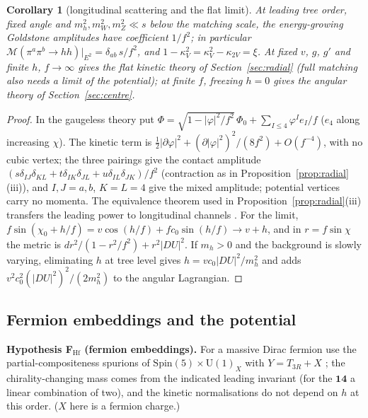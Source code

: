\documentclass[aps,pra,onecolumn,superscriptaddress,nofootinbib,10pt]{revtex4-2}
\newtheorem{corollary}[theorem]{Corollary}
\theoremstyle{definition}
\theoremstyle{remark}
\newcommand{\U}{\mathrm{U}}
\begin{document}
\begin{corollary}[longitudinal scattering and the flat limit]\label{cor:hbscatter}
At leading tree order, fixed angle and $m_h^2,m_W^2,m_Z^2\ll s$ below the matching scale, the energy-growing
Goldstone amplitudes have coefficient $1/f^2$; in particular $\mathcal M(\pi^a\pi^b\to hh)|_{E^2}=\delta_{ab}\,s/f^2$, and
$1-\kappa_V^2=\kappa_V^2-\kappa_{2V}=\xi$.  At fixed $v$, $g$, $g'$ and finite $h$, $f\to\infty$ gives the flat kinetic theory of
Section~\ref{sec:radial} (full matching also needs a limit of the potential); at finite $f$, freezing $h=0$ gives the
angular theory of Section~\ref{sec:centre}.
\end{corollary}
\begin{proof}
In the gaugeless theory put $\Phi=\sqrt{1-\lvert\varphi\rvert^2/f^2}\,\Phi_0+\sum_{I\le4}\varphi^Ie_I/f$ ($e_4$ along increasing $\chi$).  The kinetic
term is $\tfrac12\lvert\partial\varphi\rvert^2+(\partial\lvert\varphi\rvert^2)^2/(8f^2)+O(f^{-4})$, with no cubic vertex; the three pairings give the
contact amplitude $(s\delta_{IJ}\delta_{KL}+t\delta_{IK}\delta_{JL}+u\delta_{IL}\delta_{JK})/f^2$ (contraction as in Proposition~\ref{prop:radial}(iii)), and
$I,J=a,b$, $K=L=4$ give the mixed amplitude; potential vertices carry no momenta.  The equivalence theorem
used in Proposition~\ref{prop:radial}(iii) transfers the leading power to longitudinal channels \cite{CLT74,n7:SILH}.  For
the limit, $f\sin(\chi_0+h/f)=v\cos(h/f)+fc_0\sin(h/f)\to v+h$, and in $r=f\sin\chi$ the metric is $dr^2/(1-r^2/f^2)+r^2\lvert DU\rvert^2$.  If
$m_h>0$ and the background is slowly varying, eliminating $h$ at tree level gives $h=vc_0\lvert DU\rvert^2/m_h^2$ and adds
$v^2c_0^2(\lvert DU\rvert^2)^2/(2m_h^2)$ to the angular Lagrangian.
\end{proof}

\subsection{Fermion embeddings and the potential}

\smallskip\noindent\textbf{Hypothesis F$_{\mathrm{Hf}}$ (fermion embeddings).}  For a massive Dirac fermion use the partial-compositeness
spurions of $\mathrm{Spin}(5)\times\U(1)_X$ with $Y=T_{3R}+X$ \cite{n7:ACP,n7:CPW,n7:CGG,n7:PW}; the chirality-changing mass comes from
the indicated leading invariant (for the $\mathbf{14}$ a linear combination of two), and the kinetic normalisations
do not depend on $h$ at this order.  ($X$ here is a fermion charge.)
\end{document}
